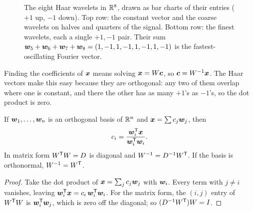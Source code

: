 \begin{figure}[ht]\centering
{}
\caption{The eight Haar wavelets in $\mathbb{R}^8$, drawn as bar charts of their entries ($+1$ up, $-1$
down). Top row: the constant vector and the coarse wavelets on halves and quarters of the
signal. Bottom row: the finest wavelets, each a single $+1,-1$ pair. Their sum
$\boldsymbol{w}_5+\boldsymbol{w}_6+\boldsymbol{w}_7+\boldsymbol{w}_8=(1,-1,1,-1,1,-1,1,-1)$ is the fastest-oscillating Fourier vector.}
\label{fig:u35-haar}
\end{figure}

Finding the coefficients of $\boldsymbol{x}$ means solving $\boldsymbol{x}=W\boldsymbol{c}$, so $\boldsymbol{c}=W^{-1}\boldsymbol{x}$. The Haar vectors make
this easy because they are orthogonal: any two of them overlap where one is constant, and there
the other has as many $+1$'s as $-1$'s, so the dot product is zero.

\begin{proposition}\label{prop:u35-coeffs}
If $\boldsymbol{w}_1,\dots,\boldsymbol{w}_n$ is an orthogonal basis of $\mathbb{R}^n$ and $\boldsymbol{x}=\sum c_j\boldsymbol{w}_j$, then
\[
  c_i=\frac{\boldsymbol{w}_i^{\mathsf{T}}\boldsymbol{x}}{\boldsymbol{w}_i^{\mathsf{T}}\boldsymbol{w}_i}.
\]
In matrix form $W^{\mathsf{T}} W=D$ is diagonal and $W^{-1}=D^{-1}W^{\mathsf{T}}$. If the basis is orthonormal, $W^{-1}=W^{\mathsf{T}}$.
\end{proposition}
\begin{proof}
Take the dot product of $\boldsymbol{x}=\sum_jc_j\boldsymbol{w}_j$ with $\boldsymbol{w}_i$. Every term with $j\ne i$ vanishes, leaving
$\boldsymbol{w}_i^{\mathsf{T}}\boldsymbol{x}=c_i\,\boldsymbol{w}_i^{\mathsf{T}}\boldsymbol{w}_i$. For the matrix form, the $(i,j)$ entry of $W^{\mathsf{T}} W$ is $\boldsymbol{w}_i^{\mathsf{T}}\boldsymbol{w}_j$, which is
zero off the diagonal; so $(D^{-1}W^{\mathsf{T}})W=I$.
\end{proof}

